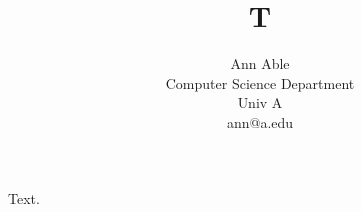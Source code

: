\documentclass[conference]{IEEEtran}
\begin{document}
\title{T}
\author{Ann Able\\ Computer Science Department\\ Univ A\\ ann@a.edu}
\maketitle
Text.
\end{document}
